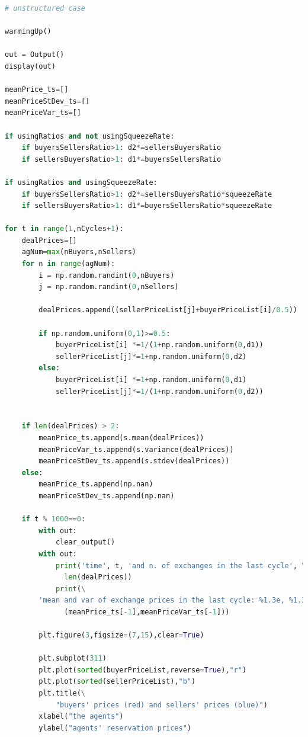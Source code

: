 \documentclass[10pt]{report}
\begin{document}
\begin{lstlisting}[language=Python, caption=The unstructured version, basicstyle=\ttfamily\footnotesize]
# unstructured case

warmingUp()

out = Output()
display(out)

meanPrice_ts=[]
meanPriceStDev_ts=[]
meanPriceVar_ts=[]

if usingRatios and not usingSqueezeRate:
    if buyersSellersRatio>1: d2*=sellersBuyersRatio
    if sellersBuyersRatio>1: d1*=buyersSellersRatio
        
if usingRatios and usingSqueezeRate:
    if buyersSellersRatio>1: d2*=sellersBuyersRatio*squeezeRate
    if sellersBuyersRatio>1: d1*=buyersSellersRatio*squeezeRate

for t in range(1,nCycles+1):    
    dealPrices=[]
    agNum=max(nBuyers,nSellers)
    for n in range(agNum):
        i = np.random.randint(0,nBuyers)
        j = np.random.randint(0,nSellers)

        dealPrices.append((sellerPriceList[j]+buyerPriceList[i]/0.5))

        if np.random.uniform(0,1)>=0.5:    
            buyerPriceList[i] *=1/(1+np.random.uniform(0,d1))
            sellerPriceList[j]*=1+np.random.uniform(0,d2)
        else:
            buyerPriceList[i] *=1+np.random.uniform(0,d1)
            sellerPriceList[j]*=1/(1+np.random.uniform(0,d2))
        
           
    if len(dealPrices) > 2:
        meanPrice_ts.append(s.mean(dealPrices))
        meanPriceVar_ts.append(s.variance(dealPrices))
        meanPriceStDev_ts.append(s.stdev(dealPrices))
    else:
        meanPrice_ts.append(np.nan)
        meanPriceStDev_ts.append(np.nan)

    if t % 1000==0:
        with out:
            clear_output()
        with out:
            print('time', t, 'and n. of exchanges in the last cycle', \
              len(dealPrices))
            print(\
        'mean and var of exchange prices in the last cycle: %1.3e, %1.3e' %\
              (meanPrice_ts[-1],meanPriceVar_ts[-1]))

        plt.figure(3,figsize=(7,15),clear=True)

        plt.subplot(311)
        plt.plot(sorted(buyerPriceList,reverse=True),"r")
        plt.plot(sorted(sellerPriceList),"b")
        plt.title(\
            "buyers' prices (red) and sellers' prices (blue)")
        xlabel("the agents")
        ylabel("agents' reservation prices")


\end{lstlisting}
\end{document}
